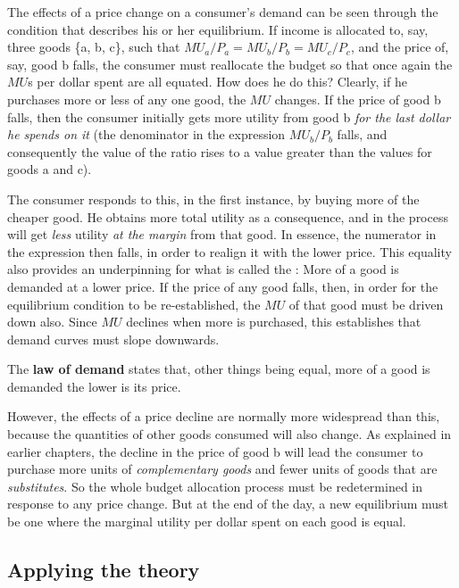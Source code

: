 The effects of a price change on a consumer's demand can be seen through the condition that describes his or her equilibrium. If income is allocated to, say, three goods \{a, b, c\}, such that $MU_a/P_a=MU_b/P_b=MU_c/P_c$, and the price of, say, good b falls, the consumer must reallocate the budget so that once again the $MU$s per dollar spent are all equated. How does he do this? Clearly, if he purchases more or less of any one good, the $MU$ changes. If the price of good b falls, then the consumer initially gets more utility from good b \textit{for the last dollar he spends on it} (the denominator in the expression $MU_b/P_b$ falls, and consequently the value of the ratio rises to a value greater than the values for goods a and c).

The consumer responds to this, in the first instance, by buying more of the cheaper good. He obtains more total utility as a consequence, and in the process will get \textit{less} utility \textit{at the margin} from that good. In essence, the numerator in the expression then falls, in order to realign it with the lower price. This equality also provides an underpinning for what is called the : More of a good is demanded at a lower price. If the price of any good falls, then, in order for the equilibrium condition to be re-established, the $MU$ of that good must be driven down also. Since $MU$ declines when more is purchased, this establishes that demand curves must slope downwards.

\begin{DefBox}
The \textbf{law of demand} states that, other things being equal, more of a good is demanded the lower is its price.
\end{DefBox}

However, the effects of a price decline are normally more widespread than this, because the quantities of other goods consumed will also change. As explained in earlier chapters, the decline in the price of good b will lead the consumer to purchase more units of \textit{complementary goods} and fewer units of goods that are \textit{substitutes}. So the whole budget allocation process must be redetermined in response to any price change. But at the end of the day, a new equilibrium must be one where the marginal utility per dollar spent on each good is equal.

\subsection*{Applying the theory}

